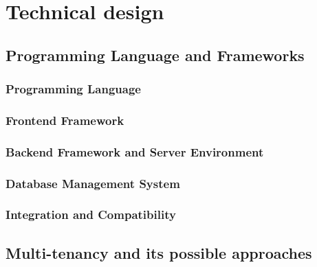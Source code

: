 \chapter{Technical design}
\label{chap:architectural-design}
\section{Programming Language and Frameworks}
\label{sec:programming-language-frameworks}
\subsection{Programming Language}
\label{subsec:programming-language}
\subsection{Frontend Framework}
\label{subsec:frontend-framework}
\subsection{Backend Framework and Server Environment}
\label{subsec:backend-framework-server-env}
\subsection{Database Management System}
\label{subsec:dbms}
\subsection{Integration and Compatibility}
\label{subsec:integration-compactibility}
\section{Multi-tenancy and its possible approaches}
\label{sec:different-approaches-for-multitanency}
